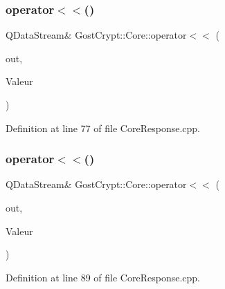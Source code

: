 \mbox{\label{namespace_gost_crypt_1_1_core_a5476ecdbbb339687a3a88652e8821ebc}} 
\subsubsection{\texorpdfstring{operator$<$$<$()}{operator<<()}\hspace{0.1cm}{\footnotesize\ttfamily [12/56]}}
{\footnotesize\ttfamily Q\+Data\+Stream\& Gost\+Crypt\+::\+Core\+::operator$<$$<$ (\begin{DoxyParamCaption}\item[{Q\+Data\+Stream \&}]{out,  }\item[{const \hyperlink{struct_gost_crypt_1_1_core_1_1_change_volume_password_response}{Change\+Volume\+Password\+Response} \&}]{Valeur }\end{DoxyParamCaption})}



Definition at line 77 of file Core\+Response.\+cpp.

\mbox{\label{namespace_gost_crypt_1_1_core_a053cb74cb25b72b213771b5c043ad625}} 
\subsubsection{\texorpdfstring{operator$<$$<$()}{operator<<()}\hspace{0.1cm}{\footnotesize\ttfamily [13/56]}}
{\footnotesize\ttfamily Q\+Data\+Stream\& Gost\+Crypt\+::\+Core\+::operator$<$$<$ (\begin{DoxyParamCaption}\item[{Q\+Data\+Stream \&}]{out,  }\item[{const \hyperlink{struct_gost_crypt_1_1_core_1_1_create_key_file_response}{Create\+Key\+File\+Response} \&}]{Valeur }\end{DoxyParamCaption})}



Definition at line 89 of file Core\+Response.\+cpp.

\mbox{\label{namespace_gost_crypt_1_1_core_a3344439470718b08bbc49c29da994cb2}} 
